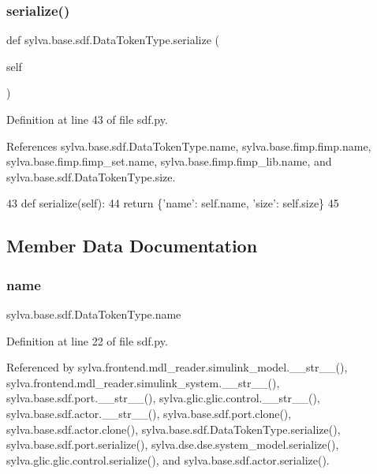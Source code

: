 \subsubsection{\texorpdfstring{serialize()}{serialize()}}
{\footnotesize\ttfamily def sylva.\+base.\+sdf.\+Data\+Token\+Type.\+serialize (\begin{DoxyParamCaption}\item[{}]{self }\end{DoxyParamCaption})}



Definition at line 43 of file sdf.\+py.



References sylva.\+base.\+sdf.\+Data\+Token\+Type.\+name, sylva.\+base.\+fimp.\+fimp.\+name, sylva.\+base.\+fimp.\+fimp\+\_\+set.\+name, sylva.\+base.\+fimp.\+fimp\+\_\+lib.\+name, and sylva.\+base.\+sdf.\+Data\+Token\+Type.\+size.


\begin{DoxyCode}
43         \textcolor{keyword}{def }serialize(self):
44             \textcolor{keywordflow}{return} \{\textcolor{stringliteral}{'name'}: self.name, \textcolor{stringliteral}{'size'}: self.size\}
45 
\end{DoxyCode}


\subsection{Member Data Documentation}
\mbox{\label{classsylva_1_1base_1_1sdf_1_1_data_token_type_a64214bba14fcba747fd608caef007924}} 
\subsubsection{\texorpdfstring{name}{name}}
{\footnotesize\ttfamily sylva.\+base.\+sdf.\+Data\+Token\+Type.\+name}



Definition at line 22 of file sdf.\+py.



Referenced by sylva.\+frontend.\+mdl\+\_\+reader.\+simulink\+\_\+model.\+\_\+\+\_\+str\+\_\+\+\_\+(), sylva.\+frontend.\+mdl\+\_\+reader.\+simulink\+\_\+system.\+\_\+\+\_\+str\+\_\+\+\_\+(), sylva.\+base.\+sdf.\+port.\+\_\+\+\_\+str\+\_\+\+\_\+(), sylva.\+glic.\+glic.\+control.\+\_\+\+\_\+str\+\_\+\+\_\+(), sylva.\+base.\+sdf.\+actor.\+\_\+\+\_\+str\+\_\+\+\_\+(), sylva.\+base.\+sdf.\+port.\+clone(), sylva.\+base.\+sdf.\+actor.\+clone(), sylva.\+base.\+sdf.\+Data\+Token\+Type.\+serialize(), sylva.\+base.\+sdf.\+port.\+serialize(), sylva.\+dse.\+dse.\+system\+\_\+model.\+serialize(), sylva.\+glic.\+glic.\+control.\+serialize(), and sylva.\+base.\+sdf.\+actor.\+serialize().

